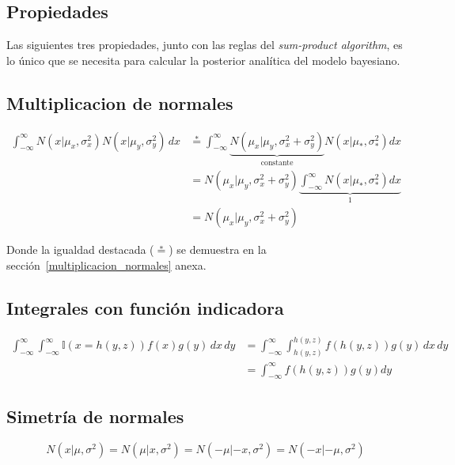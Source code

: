 \documentclass[article]{jss}
\begin{document}
\begin{appendix}
\newpage

\section{Propiedades}\label{sec:propiedades}

Las siguientes tres propiedades, junto con las reglas del \emph{sum-product algorithm}, es lo \'unico que se necesita para calcular la posterior anal\'itica del modelo bayesiano.

\subsection*{Multiplicacion de normales}
\begin{equation}\label{eq:multiplicacion_normales}
\begin{split}
 \int_{-\infty}^{\infty} N(x|\mu_x,\sigma_x^2)N(x|\mu_y,\sigma_y^2) \, dx  &  \overset{*}{=} \int_{-\infty}^{\infty}  \underbrace{N(\mu_x|\mu_y,\sigma_x^2+\sigma_y^2)}_{\text{constante}} N(x|\mu_{*},\sigma_{*}^2) dx \\
 & = N(\mu_x|\mu_y,\sigma_x^2+\sigma_y^2) \underbrace{\int_{-\infty}^{\infty}  N(x|\mu_{*},\sigma_{*}^2) dx}_{1} \\
 & = N(\mu_x|\mu_y,\sigma_x^2+\sigma_y^2)
\end{split}
\end{equation}

Donde la igualdad destacada ($\overset{*}{=}$) se demuestra en la secci\'on~\ref{multiplicacion_normales} anexa.

\subsection*{Integrales con funci\'on indicadora}
\begin{equation}\label{eq:integral_con_indicadora}
\begin{split}
 \int_{-\infty}^{\infty}  \int_{-\infty}^{\infty}  \mathbb{I}(x=h(y,z)) f(x) g(y)\, dx\, dy &=  \int_{-\infty}^{\infty} \int_{h(y,z)}^{h(y,z)} f(h(y,z)) g(y)\, dx\, dy\\
 & = \int_{-\infty}^{\infty} f(h(y,z)) g(y) dy
\end{split}
\end{equation}

\subsection*{Simetr\'ia de normales}
\begin{equation}\label{eq:simetria}
 N(x|\mu,\sigma^2) = N(\mu|x,\sigma^2) = N(-\mu|-x,\sigma^2) = N(-x|-\mu,\sigma^2)
\end{equation}


\end{appendix}
\end{document}
